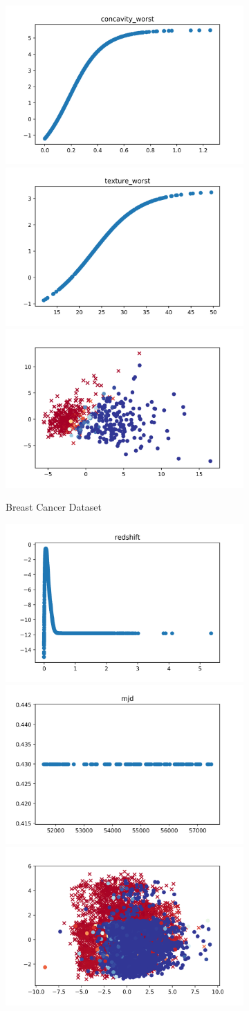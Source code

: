 \begin{figure}[!hp]
    \centering
    \begin{subfigure}{1.0\textwidth}
        \centering
        \includegraphics[width=.33\textwidth]{fig/mnl/bc1.png}%
        \includegraphics[width=.33\textwidth]{fig/mnl/bc2.png}%
        \includegraphics[width=.33\textwidth]{fig/plt/bc.png}
        \caption{Breast Cancer Dataset}
    \end{subfigure}
    \begin{subfigure}{1.0\textwidth}
        \centering
        \includegraphics[width=.33\textwidth]{fig/mnl/st1.png}%
        \includegraphics[width=.33\textwidth]{fig/mnl/st2.png}%
        \includegraphics[width=.33\textwidth]{fig/plt/st.png}

\end{subfigure}
\end{figure}
